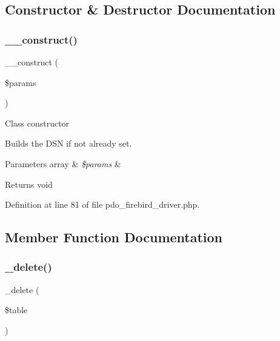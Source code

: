 \subsection{Constructor \& Destructor Documentation}
\mbox{\label{class_c_i___d_b__pdo__firebird__driver_a9162320adff1a1a4afd7f2372f753a3e}} 
\subsubsection{\texorpdfstring{\_\_construct()}{\_\_construct()}}
{\footnotesize\ttfamily \+\_\+\+\_\+construct (\begin{DoxyParamCaption}\item[{}]{\$params }\end{DoxyParamCaption})}

Class constructor

Builds the D\+SN if not already set.


\begin{DoxyParams}[1]{Parameters}
array & {\em \$params} & \\
\hline
\end{DoxyParams}
\begin{DoxyReturn}{Returns}
void 
\end{DoxyReturn}


Definition at line 81 of file pdo\+\_\+firebird\+\_\+driver.\+php.



\subsection{Member Function Documentation}
\mbox{\label{class_c_i___d_b__pdo__firebird__driver_a133ea8446ded52589bd22cc9163d0896}} 
\subsubsection{\texorpdfstring{\_delete()}{\_delete()}}
{\footnotesize\ttfamily \+\_\+delete (\begin{DoxyParamCaption}\item[{}]{\$table }\end{DoxyParamCaption})\hspace{0.3cm}{\ttfamily [protected]}}

